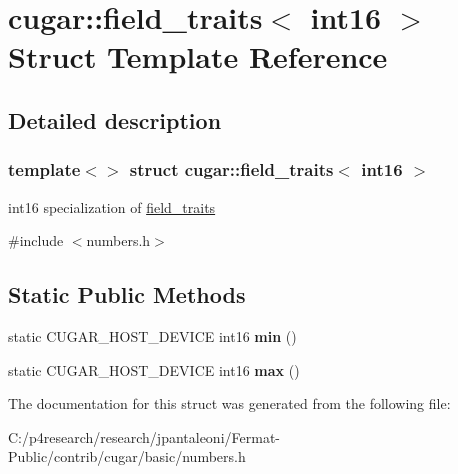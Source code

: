 \hypertarget{structcugar_1_1field__traits_3_01int16_01_4}{}\section{cugar\+:\+:field\+\_\+traits$<$ int16 $>$ Struct Template Reference}
\label{structcugar_1_1field__traits_3_01int16_01_4}


\subsection{Detailed description}
\subsubsection*{template$<$$>$\newline
struct cugar\+::field\+\_\+traits$<$ int16 $>$}

int16 specialization of \hyperlink{structcugar_1_1field__traits}{field\+\_\+traits} 

{\ttfamily \#include $<$numbers.\+h$>$}

\subsection*{Static Public Methods}
\begin{DoxyCompactItemize}
\item 
\mbox{\label{structcugar_1_1field__traits_3_01int16_01_4_a3d665a6090cc8669872a212c45c9a286}} 
static C\+U\+G\+A\+R\+\_\+\+H\+O\+S\+T\+\_\+\+D\+E\+V\+I\+CE int16 {\bfseries min} ()
\item 
\mbox{\label{structcugar_1_1field__traits_3_01int16_01_4_aacbd808673c0366ea4bd95d2eb4688d5}} 
static C\+U\+G\+A\+R\+\_\+\+H\+O\+S\+T\+\_\+\+D\+E\+V\+I\+CE int16 {\bfseries max} ()
\end{DoxyCompactItemize}


The documentation for this struct was generated from the following file\+:\begin{DoxyCompactItemize}
\item 
C\+:/p4research/research/jpantaleoni/\+Fermat-\/\+Public/contrib/cugar/basic/numbers.\+h\end{DoxyCompactItemize}
